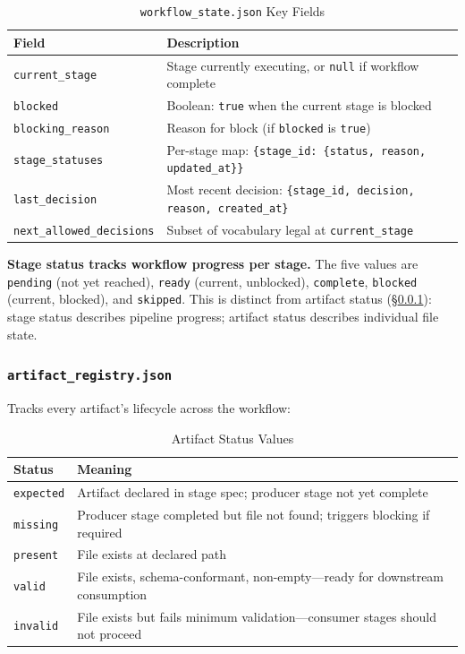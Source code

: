 \documentclass[11pt,a4paper]{article}
\begin{document}
\begin{table}[ht]
\centering
\caption{\texttt{workflow\_state.json} Key Fields}
\label{tab:workflow-state}
\begin{tabular}{@{}ll@{}}
\toprule
\textbf{Field} & \textbf{Description} \\
\midrule
\texttt{current\_stage} & Stage currently executing, or \texttt{null} if workflow complete \\
\texttt{blocked} & Boolean: \texttt{true} when the current stage is blocked \\
\texttt{blocking\_reason} & Reason for block (if \texttt{blocked} is \texttt{true}) \\
\texttt{stage\_statuses} & Per-stage map: \texttt{\{stage\_id: \{status, reason, updated\_at\}\}} \\
\texttt{last\_decision} & Most recent decision: \texttt{\{stage\_id, decision, reason, created\_at\}} \\
\texttt{next\_allowed\_decisions} & Subset of vocabulary legal at \texttt{current\_stage} \\
\bottomrule
\end{tabular}
\end{table}

\textbf{Stage status tracks workflow progress per stage.} The five values are \texttt{pending} (not yet reached), \texttt{ready} (current, unblocked), \texttt{complete}, \texttt{blocked} (current, blocked), and \texttt{skipped}. This is distinct from artifact status (\S\ref{sec:artifact-registry}): stage status describes pipeline progress; artifact status describes individual file state.

\subsubsection{\texttt{artifact\_registry.json}}
\label{sec:artifact-registry}

Tracks every artifact's lifecycle across the workflow:

\begin{table}[ht]
\centering
\caption{Artifact Status Values}
\label{tab:artifact-status}
\begin{tabular}{@{}ll@{}}
\toprule
\textbf{Status} & \textbf{Meaning} \\
\midrule
\texttt{expected} & Artifact declared in stage spec; producer stage not yet complete \\
\texttt{missing} & Producer stage completed but file not found; triggers blocking if required \\
\texttt{present} & File exists at declared path \\
\texttt{valid} & File exists, schema-conformant, non-empty---ready for downstream consumption \\
\texttt{invalid} & File exists but fails minimum validation---consumer stages should not proceed \\
\bottomrule
\end{tabular}
\end{table}
\end{document}

